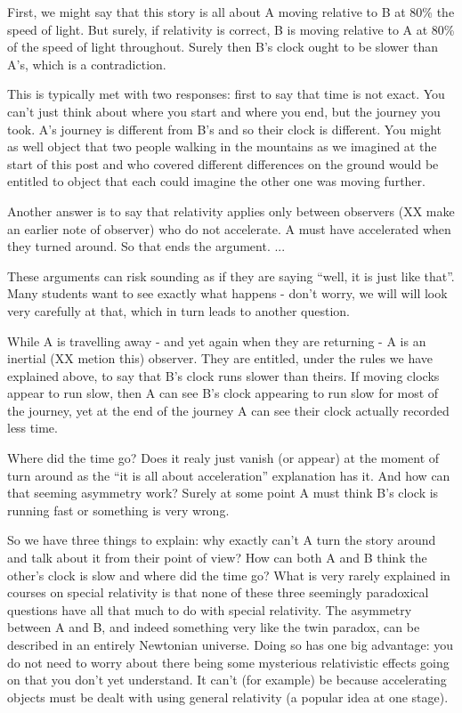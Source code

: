 \documentclass[a4paper]{report}
\begin{document}
First, we might say that this story is all about A moving relative to B at 80\% the speed of light. But surely, if relativity is correct, B is moving relative to A at 80\% of the speed of light throughout. Surely then B's clock ought to be slower than A's, which is a contradiction.

This is typically met with two responses: first to say that time is not exact. You can't just think about where you start and where you end, but the journey you took. A's journey is different from B's and so their clock is different. You might as well object that two people walking in the mountains as we imagined at the start of this post and who covered different differences on the ground would be entitled to object that each could imagine the other one was moving further.

Another answer is to say that relativity applies only between observers (XX make an earlier note of observer) who do not accelerate. A must have accelerated when they turned around. So that ends the argument. ...

These arguments can risk sounding as if they are saying ``well, it is just like that''. Many students want to see exactly what happens - don't worry, we will will look very carefully at that, which in turn leads to another question.

While A is travelling away - and yet again when they are returning - A is an inertial (XX metion this) observer. They are entitled, under the rules we have explained above, to say that B's clock runs slower than theirs. If moving clocks appear to run slow, then A can see B's clock appearing to run slow for most of the journey, yet at the end of the journey A can see their clock actually recorded less time.

Where did the time go? Does it realy just vanish (or appear) at the moment of turn around as the ``it is all about acceleration'' explanation has it.  And how can that seeming asymmetry work? Surely at some point A must think B's clock is running fast or something is very wrong.

So we have three things to explain: why exactly can't A turn the story around and talk about it from their point of view? How can both A and B think the other's clock is slow and where did the time go? What is very rarely explained in courses on special relativity is that none of these three seemingly paradoxical questions have all that much to do with special relativity. The asymmetry between A and B, and indeed something very like the twin paradox, can be described in an entirely Newtonian universe. Doing so has one big advantage: you do not need to worry about there being some mysterious relativistic effects going on that you don't yet understand. It can't (for example) be because accelerating objects must be dealt with using general relativity (a popular idea at one stage).
\end{document}
